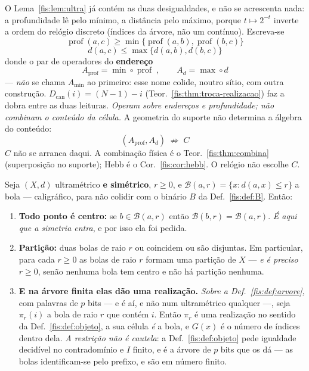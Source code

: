 \documentclass[livro.tex]{subfiles}
\begin{document}
\begin{observacao}\label{fis:obs:relogio-dual}
O Lema~\ref{fis:lem:ultra} já contém as duas desigualdades, e não se acrescenta
nada: a profundidade lê pelo mínimo, a distância pelo máximo, porque
$t\mapsto 2^{-t}$ inverte a ordem do relógio discreto (índices da árvore, não
um contínuo). Escreva-se
\[
\boxed{\;
\operatorname{prof}(a,c)\ge
\min\bigl\{\operatorname{prof}(a,b),\operatorname{prof}(b,c)\bigr\}
\;}
\]
\[
\boxed{\;
d(a,c)\le
\max\bigl\{d(a,b),d(b,c)\bigr\}
\;}
\]
donde o par de operadores do \textbf{endereço}
\[
\boxed{\;
A_{\mathrm{prof}}=\min\circ\operatorname{prof}
\;,\qquad
A_d=\max\circ d
\;}
\]
--- \emph{não} se chama $A_{\min}$ ao primeiro: esse nome colide, noutro sítio,
com outra construção. $D_{\mathrm{can}}(i)=(N-1)-i$
(Teor.~\ref{fis:thm:troca-realizacao}) faz a dobra entre as duas leituras.
\emph{Operam sobre endereços e profundidade; não combinam o conteúdo da célula.}
A geometria do suporte não determina a álgebra do conteúdo:
\[
\boxed{\;(A_{\mathrm{prof}},A_d)\;\nRightarrow\;C\;}
\]
$C$ não se arranca daqui. A combinação física é o Teor.~\ref{fis:thm:combina}
(superposição no suporte); Hebb é o Cor.~\ref{fis:cor:hebb}. O relógio não
escolhe $C$.
\end{observacao}

\begin{teorema}\label{fis:thm:bolas}
Seja $(X,d)$ ultramétrico \textbf{e simétrico}, $r\ge0$, e
$\mathcal{B}(a,r)=\{x: d(a,x)\le r\}$ a bola --- caligráfico, para não colidir com
o binário $B$ da Def.~\ref{fis:def:B}. Então:
\begin{enumerate}\itemsep3pt
\item[(1)] \textbf{Todo ponto é centro:} se $b\in \mathcal{B}(a,r)$ então
$\mathcal{B}(b,r)=\mathcal{B}(a,r)$. \emph{É aqui que a simetria entra}, e por
isso ela foi pedida.
\item[(2)] \textbf{Partição:} duas bolas de raio $r$ ou coincidem ou são
disjuntas. Em particular, para cada $r\ge0$ as bolas de raio $r$ formam uma
partição de $X$ --- \emph{e é preciso $r\ge0$}, senão nenhuma bola tem centro e
não há partição nenhuma.
\item[(3)] \textbf{E na árvore finita elas dão uma realização.} \emph{Sobre a
Def.~\ref{fis:def:arvore}}, com palavras de $p$ bits --- e é aí, e não num
ultramétrico qualquer ---, seja $\pi_r(i)$ a bola de raio $r$ que contém $i$.
Então $\pi_r$ é uma realização no sentido da Def.~\ref{fis:def:objeto}, a sua
célula \emph{é} a bola, e $G(x)$ é o número de índices dentro dela.
\emph{A restrição não é cautela}: a Def.~\ref{fis:def:objeto} pede igualdade
decidível no contradomínio e $I$ finito, e é a árvore de $p$ bits que os dá ---
as bolas identificam-se pelo prefixo, e são em número finito.
\end{enumerate}
\end{teorema}
\end{document}
